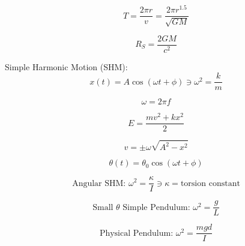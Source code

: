 \documentclass[12pt]{article}
\begin{document}
\begin{equation}
	T = \dfrac{2 \pi r}v = \dfrac{2 \pi r^{1.5}}{\sqrt{G M}}
\end{equation}

\begin{equation}
	R_S = \dfrac{2 G M}{c^2}
\end{equation}

\pagebreak
\restoregeometry

Simple Harmonic Motion (SHM):
\begin{equation}
	x(t) = A \cos(\omega t + \phi) \ni \omega^2 = \dfrac k m
\end{equation}

\begin{equation}
	\omega = 2 \pi f
\end{equation}

\begin{equation}
	E = \dfrac{m v^2 + k x^2}2
\end{equation}

\begin{equation}
	v = \pm \omega \sqrt{A^2 - x^2}
\end{equation}

\begin{equation}
	\theta(t) = \theta_0 \cos(\omega t + \phi)
\end{equation}

\begin{equation}
	\text{Angular SHM: } \omega^2 = \dfrac \kappa I \ni \kappa = \text{torsion constant}
\end{equation}

\begin{equation}
	\text{Small $\theta$ Simple Pendulum: } \omega^2 = \dfrac g L
\end{equation}

\begin{equation}
	\text{Physical Pendulum: } \omega^2 = \dfrac {mgd} I
\end{equation}

\ifx \combinedDocuments \undefined
\end{document}

